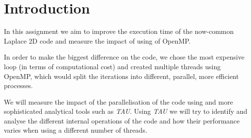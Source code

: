 \section{Introduction}

In this assignment we aim to improve the execution time of the now-common Laplace 2D code and measure the impact of using of OpenMP.

In order to make the biggest difference on the code, we chose the most expensive loop (in terms of computational cost) and created multiple threads using OpenMP, which would split the iterations into different, parallel, more efficient processes.

We will measure the impact of the parallelisation of the code using  and more sophisticated analytical tools such as \emph{TAU}. Using \emph{TAU} we will try to identify and analyse the different internal operations of the code and how their performance varies when using a different number of threads.





